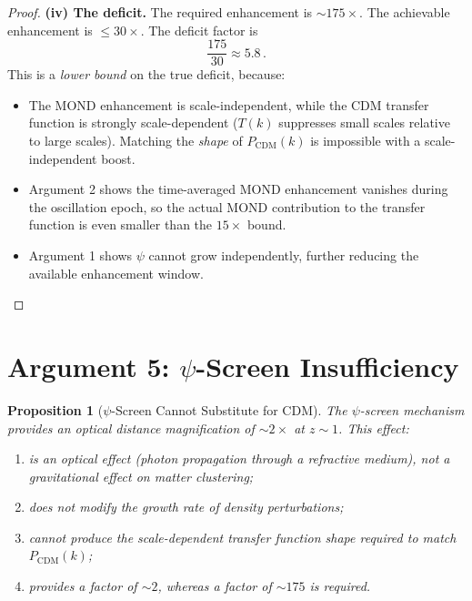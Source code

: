 \documentclass[12pt,a4paper]{article}
\newtheorem{proposition}[theorem]{Proposition}
\begin{document}
\begin{proof}
\textbf{(iv) The deficit.}
The required enhancement is $\sim 175\times$. The achievable enhancement
is $\leq 30\times$. The deficit factor is
\begin{equation}
\frac{175}{30} \approx 5.8\,.
\end{equation}
This is a \emph{lower bound} on the true deficit, because:
\begin{itemize}
\item The MOND enhancement is scale-independent, while the CDM
      transfer function is strongly scale-dependent ($T(k)$ suppresses
      small scales relative to large scales). Matching the \emph{shape}
      of $P_{\mathrm{CDM}}(k)$ is impossible with a scale-independent
      boost.
\item Argument 2 shows the time-averaged MOND enhancement vanishes
      during the oscillation epoch, so the actual MOND contribution
      to the transfer function is even smaller than the $15\times$
      bound.
\item Argument 1 shows $\psi$ cannot grow independently, further
      reducing the available enhancement window.
\end{itemize}
\end{proof}

\section{Argument 5: $\psi$-Screen Insufficiency}
\label{sec:arg5}

\begin{proposition}[$\psi$-Screen Cannot Substitute for CDM]
\label{prop:screen}
The $\psi$-screen mechanism provides an optical distance magnification
of $\sim 2\times$ at $z \sim 1$. This effect:
\begin{enumerate}
\item[(a)] is an optical effect (photon propagation through a refractive
medium), not a gravitational effect on matter clustering;
\item[(b)] does not modify the growth rate of density perturbations;
\item[(c)] cannot produce the scale-dependent transfer function shape
required to match $P_{\mathrm{CDM}}(k)$;
\item[(d)] provides a factor of $\sim 2$, whereas a factor of $\sim 175$
is required.
\end{enumerate}
\end{proposition}
\end{document}
